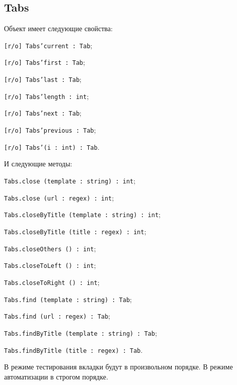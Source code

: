 \subsection{{\color{orange} Tabs}}

Объект \tabs{} имеет следующие свойства:
\begin{icItems}
	\item \texttt{[r/o] Tabs'current : Tab};
	\item \texttt{[r/o] Tabs'first : Tab};
	\item \texttt{[r/o] Tabs'last : Tab};
	\item \texttt{[r/o] Tabs'length : int};
	\item \texttt{[r/o] Tabs'next : Tab};
	\item \texttt{[r/o] Tabs'previous : Tab};
	\item \texttt{[r/o] Tabs'(i : int) : Tab}.
\end{icItems}

И следующие методы:
\begin{icItems}
	\item \texttt{Tabs.close (template : string) : int};
	\item \texttt{Tabs.close (url : regex) : int};
	\item \texttt{Tabs.closeByTitle (template : string) : int};
	\item \texttt{Tabs.closeByTitle (title : regex) : int};
	\item \texttt{Tabs.closeOthers () : int};
	\item \texttt{Tabs.closeToLeft () : int};
	\item \texttt{Tabs.closeToRight () : int};
	\item \texttt{Tabs.find (template : string) : Tab};
	\item \texttt{Tabs.find (url : regex) : Tab};
	\item \texttt{Tabs.findByTitle (template : string) : Tab};
	\item \texttt{Tabs.findByTitle (title : regex) : Tab}.
\end{icItems}

В режиме тестирования вкладки будут в произвольном порядке. В режиме автоматизации в строгом порядке.


